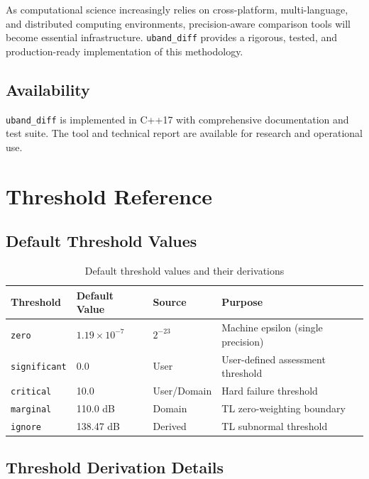 \documentclass[11pt,letterpaper]{article}
\newcommand{\ubdiff}{\texttt{uband\_diff}}
\begin{document}
As computational science increasingly relies on cross-platform, multi-language, and distributed computing environments, precision-aware comparison tools will become essential infrastructure. \ubdiff{} provides a rigorous, tested, and production-ready implementation of this methodology.

\subsection{Availability}

\ubdiff{} is implemented in C++17 with comprehensive documentation and test suite. The tool and technical report are available for research and operational use.

\appendix

\section{Threshold Reference}
\label{app:thresholds}

\subsection{Default Threshold Values}

\begin{table}[h]
\centering
\begin{tabular}{@{}llll@{}}
\toprule
\textbf{Threshold} & \textbf{Default Value} & \textbf{Source} & \textbf{Purpose} \\ \midrule
\texttt{zero} & $1.19 \times 10^{-7}$ & $2^{-23}$ & Machine epsilon (single precision) \\
\texttt{significant} & 0.0 & User & User-defined assessment threshold \\
\texttt{critical} & 10.0 & User/Domain & Hard failure threshold \\
\texttt{marginal} & 110.0 dB & Domain & TL zero-weighting boundary \\
\texttt{ignore} & 138.47 dB & Derived & TL subnormal threshold \\ \bottomrule
\end{tabular}
\caption{Default threshold values and their derivations}
\label{tab:thresholds}
\end{table}

\subsection{Threshold Derivation Details}
\end{document}
